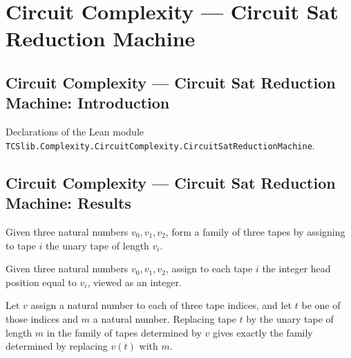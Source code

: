 \section{Circuit Complexity --- Circuit Sat Reduction Machine}
\subsection*{Circuit Complexity --- Circuit Sat Reduction Machine: Introduction}

Declarations of the Lean module \texttt{TCSlib.Complexity.CircuitComplexity.CircuitSatReductionMachine}.

\subsection*{Circuit Complexity --- Circuit Sat Reduction Machine: Results}

\begin{definition}
\label{BoolCircuit.CktSatReduction.Emitter.tapesOf}
\leanok
{}
Given three natural numbers $v_0,v_1,v_2$, form a family of three tapes by assigning to
tape $i$ the unary tape of length $v_i$.
\end{definition}

\begin{definition}
\label{BoolCircuit.CktSatReduction.Emitter.headsOf}
\leanok
Given three natural numbers $v_0,v_1,v_2$, assign to each tape $i$ the integer head
position equal to $v_i$, viewed as an integer.
\end{definition}

\begin{theorem}
\label{BoolCircuit.CktSatReduction.Emitter.tapesOf_update}
\leanok
{}
Let $v$ assign a natural number to each of three tape indices, and let $t$ be one of
those indices and $m$ a natural number. Replacing tape $t$ by the unary tape of length
$m$ in the family of tapes determined by $v$ gives exactly the family determined by
replacing $v(t)$ with $m$.
\end{theorem}

